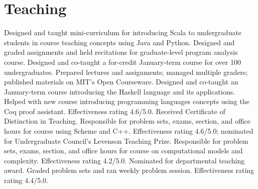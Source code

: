 \documentclass[10pt,a4paper]{moderncv}
\begin{document}
\section{Teaching}
  {}{Designed and taught mini-curriculum for introducing Scala to undergraduate students in course teaching concepts using Java and Python.}
  {}{Designed and graded assignments and held recitations for graduate-level program analysis course.}
  {}{Designed and co-taught a for-credit January-term course for over 100 undergraduates.  Prepared lectures and assignments; managed multiple graders; published materials on MIT's Open Courseware.}
  {}{Designed and co-taught an January-term course introducing the Haskell language and its applications.}
  {}{Helped with new course introducing programming languages concepts using the Coq proof assistant.  Effectiveness rating 4.6/5.0.  Received Certificate of Distinction in Teaching.}
  {Responsible for problem sets, exams, section, and office hours for course using Scheme and C++.  Effectiveness rating 4.6/5.0; nominated for Undergraduate Council's Levenson Teaching Prize.}
  {Responsible for problem sets, exams, section, and office hours for course on computational models and complexity.  Effectiveness rating 4.2/5.0.  Nominated for departmental teaching award.}
  {Graded problem sets and ran weekly problem session.  Effectiveness rating rating 4.4/5.0.}
\end{document}
